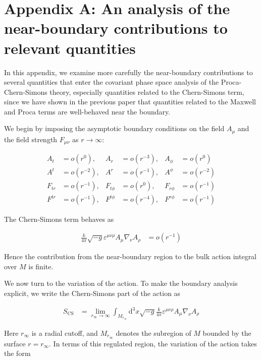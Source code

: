\section{Appendix A: An analysis of the near-boundary contributions to relevant quantities}\label{app:near-boundary-contributions}

In this appendix, we examine more carefully the near-boundary contributions to several quantities that enter the covariant phase space analysis of the Proca-Chern-Simons theory, especially quantities related to the Chern-Simons term, since we have shown in the previous paper that quantities related to the Maxwell and Proca terms are well-behaved near the boundary.

We begin by imposing the asymptotic boundary conditions on the field $A_\mu$ and the field strength $F_{\mu \nu}$ as $r \to \infty$:

\begin{align}
A_{t} & =o(r^{0}), & A_{r} & =o(r^{-3}), &A_{\phi} & =o(r^{0}) \\
A^{t} & =o(r^{-2}), & A^{r} & =o(r^{-1}), & A^{\phi} & =o(r^{-2}) \\
F_{tr} & =o(r^{-1}), & F_{t\phi} & =o(r^{0}), & F_{r\phi} & =o(r^{-1}) \\
F^{tr} & =o(r^{-1}), & F^{t\phi} & =o(r^{-4}), & F^{r\phi} & =o(r^{-1})
\end{align}

The Chern-Simons term behaves as

\begin{align}
\frac{k}{4\pi}\sqrt{ -g }\varepsilon ^{\mu \nu \rho}A_{\mu}\nabla _{\nu}A_{\rho} & =o(r^{-1})
\end{align}

Hence the contribution from the near-boundary region to the bulk action integral over $M$ is finite.

We now turn to the variation of the action. To make the boundary analysis explicit, we write the Chern-Simons part of the action as

\begin{align}
S_{\text{CS}} & =\lim_{ r_{\infty} \to \infty }\int _{M_{r_{\infty}}}\mathrm{d}^{3}x\sqrt{ -g } \frac{k}{4\pi}\varepsilon ^{\mu \nu \rho}A_{\mu}\nabla _{\nu}A_{\rho}
\end{align}

Here $r_{\infty}$ is a radial cutoff, and $M_{r_{\infty}}$ denotes the subregion of $M$ bounded by the surface $r=r_{\infty}$. In terms of this regulated region, the variation of the action takes the form

